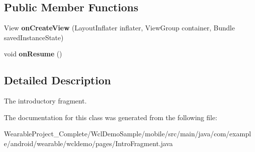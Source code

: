 \subsection*{Public Member Functions}
\begin{DoxyCompactItemize}
\item 
View {\bfseries on\+Create\+View} (Layout\+Inflater inflater, View\+Group container, Bundle saved\+Instance\+State)\hypertarget{classcom_1_1example_1_1android_1_1wearable_1_1wcldemo_1_1pages_1_1IntroFragment_a43880b094ce13fa15e0248128735cdd7}{}\label{classcom_1_1example_1_1android_1_1wearable_1_1wcldemo_1_1pages_1_1IntroFragment_a43880b094ce13fa15e0248128735cdd7}

\item 
void {\bfseries on\+Resume} ()\hypertarget{classcom_1_1example_1_1android_1_1wearable_1_1wcldemo_1_1pages_1_1IntroFragment_acc8abf17bc7afae0a24fcea284fa1dfe}{}\label{classcom_1_1example_1_1android_1_1wearable_1_1wcldemo_1_1pages_1_1IntroFragment_acc8abf17bc7afae0a24fcea284fa1dfe}

\end{DoxyCompactItemize}


\subsection{Detailed Description}
The introductory fragment. 

The documentation for this class was generated from the following file\+:\begin{DoxyCompactItemize}
\item 
Wearable\+Project\+\_\+\+Complete/\+Wcl\+Demo\+Sample/mobile/src/main/java/com/example/android/wearable/wcldemo/pages/Intro\+Fragment.\+java\end{DoxyCompactItemize}

